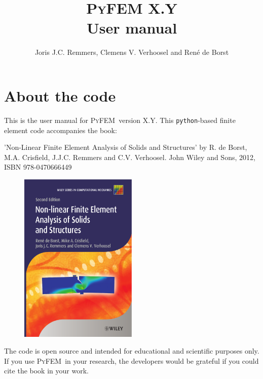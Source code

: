 \documentclass{article}
\title{\textsc{PyFEM} X.Y\\
\vspace{1cm}
User manual}
\author{Joris J.C. Remmers, Clemens V. Verhoosel and Ren\'e de Borst}
\newcommand{\progname}{\textsc{PyFEM}}
\begin{document}
\maketitle

\tableofcontents

\section{About the code}

This is the user manual for \progname~version X.Y. This \texttt{python}-based finite element code 
accompanies the book:                                              
          
\vspace{3mm}                                                       
\noindent         
'Non-Linear Finite Element Analysis of Solids and Structures' by      
 R. de Borst, M.A. Crisfield, J.J.C. Remmers and C.V. Verhoosel.        
 John Wiley and Sons, 2012, ISBN 978-0470666449                        

\begin{figure}[h]
\centering\includegraphics[width=0.5\textwidth]{img/cover.eps}
\end{figure}
                                                                          
\noindent
The code is open source and intended for educational and scientific     
purposes only. If you use \progname~in your research, the developers would 
be grateful if you could cite the book in your work. 
                                                                          
\end{document}
